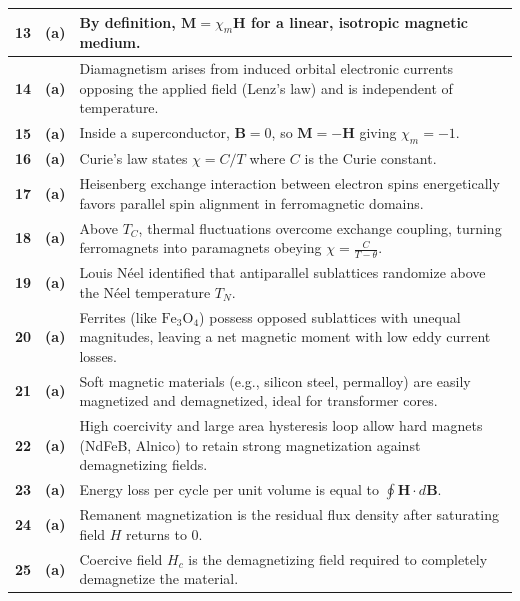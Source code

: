 {\begin{tabularx}{\textwidth}{|c|c|X|}
\textbf{13} & \textbf{(a)} & By definition, $\mathbf{M} = \chi_m \mathbf{H}$ for a linear, isotropic magnetic medium. \\ \hline
\textbf{14} & \textbf{(a)} & Diamagnetism arises from induced orbital electronic currents opposing the applied field (Lenz's law) and is independent of temperature. \\ \hline
\textbf{15} & \textbf{(a)} & Inside a superconductor, $\mathbf{B} = 0$, so $\mathbf{M} = -\mathbf{H}$ giving $\chi_m = -1$. \\ \hline
\textbf{16} & \textbf{(a)} & Curie's law states $\chi = C/T$ where $C$ is the Curie constant. \\ \hline
\textbf{17} & \textbf{(a)} & Heisenberg exchange interaction between electron spins energetically favors parallel spin alignment in ferromagnetic domains. \\ \hline
\textbf{18} & \textbf{(a)} & Above $T_C$, thermal fluctuations overcome exchange coupling, turning ferromagnets into paramagnets obeying $\chi = \frac{C}{T - \theta}$. \\ \hline
\textbf{19} & \textbf{(a)} & Louis Néel identified that antiparallel sublattices randomize above the Néel temperature $T_N$. \\ \hline
\textbf{20} & \textbf{(a)} & Ferrites (like $\text{Fe}_3\text{O}_4$) possess opposed sublattices with unequal magnitudes, leaving a net magnetic moment with low eddy current losses. \\ \hline
\textbf{21} & \textbf{(a)} & Soft magnetic materials (e.g., silicon steel, permalloy) are easily magnetized and demagnetized, ideal for transformer cores. \\ \hline
\textbf{22} & \textbf{(a)} & High coercivity and large area hysteresis loop allow hard magnets (NdFeB, Alnico) to retain strong magnetization against demagnetizing fields. \\ \hline
\textbf{23} & \textbf{(a)} & Energy loss per cycle per unit volume is equal to $\oint \mathbf{H} \cdot d\mathbf{B}$. \\ \hline
\textbf{24} & \textbf{(a)} & Remanent magnetization is the residual flux density after saturating field $H$ returns to 0. \\ \hline
\textbf{25} & \textbf{(a)} & Coercive field $H_c$ is the demagnetizing field required to completely demagnetize the material. \\ \hline
\end{tabularx}
}

\newpage

